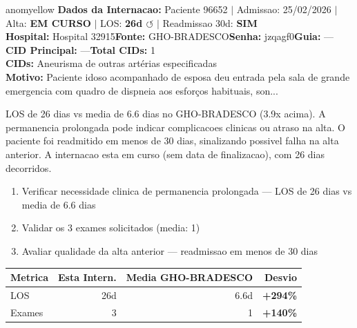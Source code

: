 \documentclass[a4paper,10pt]{article}
\begin{document}
\begin{anomalycard}[Internacao 118702 | GHO-BRADESCO | MODERADO (z=2.07)]{anomyellow}
\textbf{Dados da Internacao:} Paciente 96652 $\mid$ Admissao: 25/02/2026 $\mid$ Alta: \textcolor{anomorange}{\textbf{EM CURSO}} $\mid$ LOS: \textbf{26d \textcolor{anomorange}{$\circlearrowleft$}} $\mid$ Readmissao 30d: \textcolor{anomred}{\textbf{SIM}}\\
\textbf{Hospital:} Hospital 32915\quad\textbf{Fonte:} GHO-BRADESCO\quad\textbf{Senha:} jzqagf0\quad\textbf{Guia:} ---\\
\textbf{CID Principal:} {\small ---}\quad\textbf{Total CIDs:} 1\\

\textbf{CIDs:} {\scriptsize Aneurisma de outras artérias especificadas}\\

\textbf{Motivo:} {\scriptsize Paciente idoso acompanhado de esposa deu entrada pela sala de grande emergencia com quadro de dispneia aos esforços habituais, son...}\\

\vspace{2pt}\begin{tcolorbox}[colback=severityred!20,colframe=anomyellow,title={\textbf{Interpretacao de Negocio}},fonttitle=\bfseries\small,left=4pt,right=4pt,top=3pt,bottom=3pt]
{\small LOS de 26 dias vs media de 6.6 dias no GHO-BRADESCO (3.9x acima). A permanencia prolongada pode indicar complicacoes clinicas ou atraso na alta. O paciente foi readmitido em menos de 30 dias, sinalizando possivel falha na alta anterior. A internacao esta em curso (sem data de finalizacao), com 26 dias decorridos.}
\end{tcolorbox}
\begin{tcolorbox}[colback=severityyellow!30,colframe=anomorange,title={\textbf{Recomendacoes Especificas}},fonttitle=\bfseries\small,left=4pt,right=4pt,top=3pt,bottom=3pt]
\begin{enumerate}[nosep,leftmargin=16pt]
\item {\small Verificar necessidade clinica de permanencia prolongada --- LOS de 26 dias vs media de 6.6 dias}
\item {\small Validar os 3 exames solicitados (media: 1)}
\item {\small Avaliar qualidade da alta anterior --- readmissao em menos de 30 dias}
\end{enumerate}
\end{tcolorbox}
\begin{center}\begin{tabular}{l r r r}\toprule\textbf{Metrica} & \textbf{Esta Intern.} & \textbf{Media GHO-BRADESCO} & \textbf{Desvio} \\\midrule
LOS & 26d & 6.6d & \textcolor{anomred}{\textbf{+294\%}} \\
Exames & 3 & 1 & \textcolor{anomred}{\textbf{+140\%}} \\
\bottomrule\end{tabular}\end{center}


\end{anomalycard}
\end{document}
